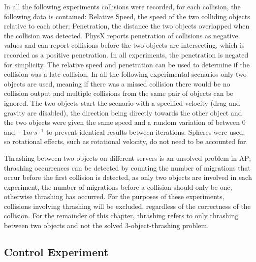 

In all the following experiments collisions were recorded, for each collision, the following data is contained: Relative Speed, the speed of the two colliding objects relative to each other; Penetration, the distance the two objects overlapped when the collision was detected. PhysX reports penetration of collisions as negative values and can report collisions before the two objects are intersecting, which is recorded as a positive penetration. In all experiments, the penetration is negated for simplicity. The relative speed and penetration can be used to determine if the collision was a late collision. In all the following experimental scenarios only two objects are used, meaning if there was a missed collision there would be no collision output and multiple collisions from the same pair of objects can be ignored. The two objects start the scenario with a specified velocity (drag and gravity are disabled), the direction being directly towards the other object and the two objects were given the same speed and a random variation of between $0$ and $-1m\mathord{\cdot}s^{-1}$ to prevent identical results between iterations. Spheres were used, so rotational effects, such as rotational velocity, do not need to be accounted for. 

Thrashing between two objects on different servers is an unsolved problem in AP; thrashing occurrences can be detected by counting the number of migrations that occur before the first collision is detected, as only two objects are involved in each experiment, the number of migrations before a collision should only be one, otherwise thrashing has occurred. For the purposes of these experiments, collisions involving thrashing will be excluded, regardless of the correctness of the collision. For the remainder of this chapter, thrashing refers to only thrashing between two objects and not the solved 3-object-thrashing problem.


\subsection{Control Experiment}

